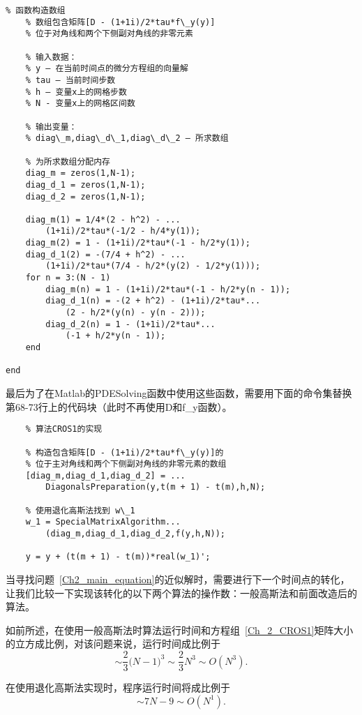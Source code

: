 \documentclass[twoside]{book}
\begin{document}
\begin{CJK*}{GBK}{song}
\begin{lstlisting}
% 函数构造数组
    % 数组包含矩阵[D - (1+1i)/2*tau*f\_y(y)]
    % 位于对角线和两个下侧副对角线的非零元素

    % 输入数据：
    % y – 在当前时间点的微分方程组的向量解
    % tau – 当前时间步数
    % h – 变量x上的网格步数
    % N - 变量x上的网格区间数

    % 输出变量：
    % diag\_m,diag\_d\_1,diag\_d\_2 – 所求数组

    % 为所求数组分配内存
    diag_m = zeros(1,N-1);
    diag_d_1 = zeros(1,N-1);
    diag_d_2 = zeros(1,N-1);

    diag_m(1) = 1/4*(2 - h^2) - ...
        (1+1i)/2*tau*(-1/2 - h/4*y(1));
    diag_m(2) = 1 - (1+1i)/2*tau*(-1 - h/2*y(1));
    diag_d_1(2) = -(7/4 + h^2) - ...
        (1+1i)/2*tau*(7/4 - h/2*(y(2) - 1/2*y(1)));
    for n = 3:(N - 1)
        diag_m(n) = 1 - (1+1i)/2*tau*(-1 - h/2*y(n - 1));
        diag_d_1(n) = -(2 + h^2) - (1+1i)/2*tau*...
            (2 - h/2*(y(n) - y(n - 2)));
        diag_d_2(n) = 1 - (1+1i)/2*tau*...
            (-1 + h/2*y(n - 1));
    end

end
\end{lstlisting}

最后为了在Matlab的PDESolving函数中使用这些函数，需要用下面的命令集替换第68-73行上的代码块（此时不再使用D和f\_y函数）。
\begin{lstlisting}
    % 算法CROS1的实现

    % 构造包含矩阵[D - (1+1i)/2*tau*f\_y(y)]的
    % 位于主对角线和两个下侧副对角线的非零元素的数组
    [diag_m,diag_d_1,diag_d_2] = ...
        DiagonalsPreparation(y,t(m + 1) - t(m),h,N);

    % 使用退化高斯法找到 w\_1
    w_1 = SpecialMatrixAlgorithm...
        (diag_m,diag_d_1,diag_d_2,f(y,h,N));

    y = y + (t(m + 1) - t(m))*real(w_1)';
\end{lstlisting}

当寻找问题~\eqref{Ch2_main_equation}的近似解时，需要进行下一个时间点的转化，让我们比较一下实现该转化的以下两个算法的操作数：一般高斯法和前面改造后的算法。

如前所述，在使用一般高斯法时算法运行时间和方程组~\eqref{Ch_2_CROS1}矩阵大小的立方成比例，对该问题来说，运行时间成比例于
\begin{equation*}
    \sim \dfrac{2}{3}\big(N - 1\big)^3 \sim \dfrac{2}{3} N^3 \sim O(N^3).
\end{equation*}

在使用退化高斯法实现时，程序运行时间将成比例于
\begin{equation*}
    \sim 7N - 9 \sim O(N^1).
\end{equation*}


\end{CJK*}
\end{document}
